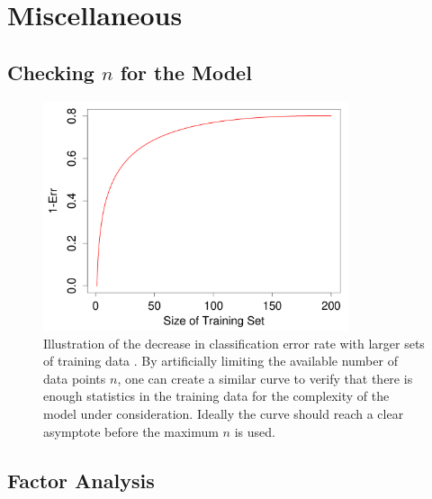\section{Miscellaneous}
\label{additional:misc}

\subsection{Checking \texorpdfstring{$n$}{N} for the Model}
\label{additional:misc:enough_data}

\begin{figure}
\centering
\includegraphics[width=0.8\textwidth]{figures/ml/acc_vs_n.png}
\caption{
Illustration of the decrease in classification error rate
with larger sets of training data \cite{HastieTF09}.
By artificially limiting the available number of data points $n$,
one can create a similar curve to verify that
there is enough statistics in the training data
for the complexity of the model under consideration.
Ideally the curve should reach a clear asymptote before the maximum $n$ is used.
}
\label{fig:additional:misc:enough_data}
\end{figure}

\subsection{Factor Analysis}
\label{additional:misc:factor_ana}

